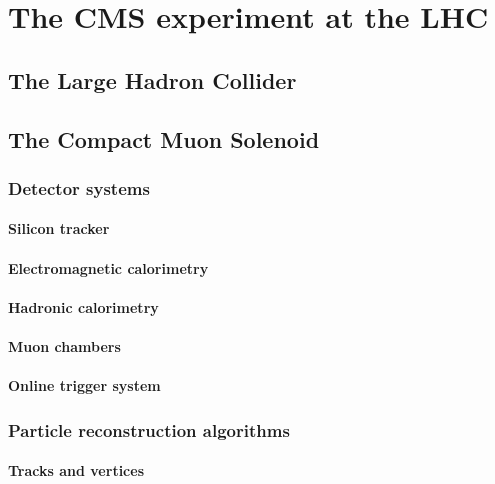 \chapter{The CMS experiment at the LHC}

\section{The Large Hadron Collider}

\section{The Compact Muon Solenoid}

\subsection{Detector systems}

\subsubsection{Silicon tracker}

\subsubsection{Electromagnetic calorimetry}

\subsubsection{Hadronic calorimetry}

\subsubsection{Muon chambers}

\subsubsection{Online trigger system}

\subsection{Particle reconstruction algorithms}

\subsubsection{Tracks and vertices}

